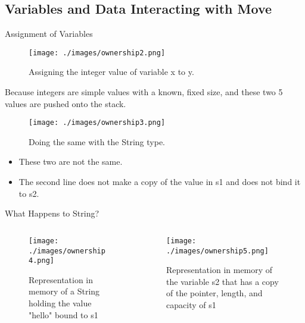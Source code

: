 \documentclass[10pt]{beamer}
\begin{document}
\subsection{Variables and Data Interacting with Move}
\begin{frame}{Assignment of Variables}
    \begin{figure}[htpb]
        \centering
        \texttt{[image: ./images/ownership2.png]}
        \caption{Assigning the integer value of variable x to y.\cite{rust-book}}
    \end{figure}
    Because integers are simple values with a known, fixed size, and these two 5 values are pushed onto the stack.\cite{rust-book}

    \begin{figure}[htpb]
        \centering
        \texttt{[image: ./images/ownership3.png]}
        \caption{Doing the same with the String type.\cite{rust-book}}
    \end{figure}

    \begin{itemize}
        \item These two are not the same.
        \item The second line does not make a copy of the value in s1 and does not bind it to s2.
    \end{itemize}
\end{frame}

\begin{frame}{What Happens to String?}
    \vspace*{-3.5mm}
    \begin{columns}
        \begin{column}{0.5\textwidth}
            \begin{figure}[htpb]
                \centering
                \texttt{[image: ./images/ownership4.png]}
                \caption{Representation in memory of a String holding the value "hello" bound to s1\cite{rust-book}}
            \end{figure}

        \end{column}
        \begin{column}{0.5\textwidth}
            \begin{figure}[htpb]
                \centering
                \texttt{[image: ./images/ownership5.png]}
                \caption{Representation in memory of the variable s2 that has a copy of the pointer, length, and capacity of s1\cite{rust-book}}
            \end{figure}
        \end{column}
    \end{columns}
\end{frame}
\end{document}
